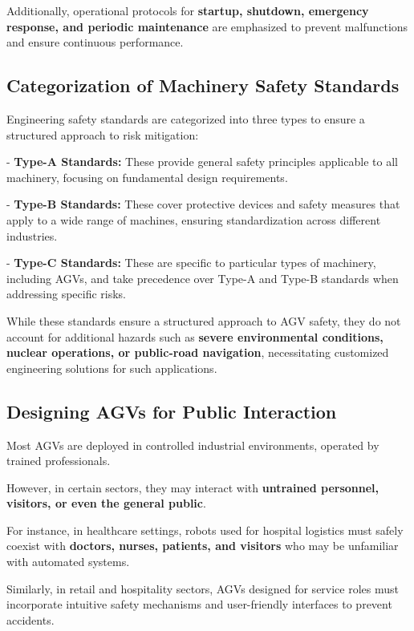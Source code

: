 \documentclass[../../main]{subfiles}
\begin{document}
Additionally, operational protocols for \textbf{startup, shutdown, 
emergency response, and periodic maintenance} are emphasized to prevent 
malfunctions and ensure continuous performance.

\subsection{Categorization of Machinery Safety Standards}

Engineering safety standards are categorized into three types to ensure 
a structured approach to risk mitigation:

- \textbf{Type-A Standards:} These provide general safety principles 
  applicable to all machinery, focusing on fundamental design requirements.

- \textbf{Type-B Standards:} These cover protective devices and safety 
  measures that apply to a wide range of machines, ensuring standardization 
  across different industries.

- \textbf{Type-C Standards:} These are specific to particular types of 
  machinery, including AGVs, and take precedence over Type-A and Type-B 
  standards when addressing specific risks.

While these standards ensure a structured approach to AGV safety, 
they do not account for additional hazards such as \textbf{severe 
environmental conditions, nuclear operations, or public-road navigation}, 
necessitating customized engineering solutions for such applications.

\subsection{Designing AGVs for Public Interaction}

Most AGVs are deployed in controlled industrial environments, operated 
by trained professionals. 

However, in certain sectors, they may interact with \textbf{untrained personnel, 
visitors, or even the general public}. 

For instance, in healthcare settings, robots used for hospital logistics 
must safely coexist with \textbf{doctors, nurses, patients, and visitors} 
who may be unfamiliar with automated systems. 

Similarly, in retail and hospitality sectors, AGVs designed for service 
roles must incorporate intuitive safety mechanisms and user-friendly 
interfaces to prevent accidents.
\end{document}
